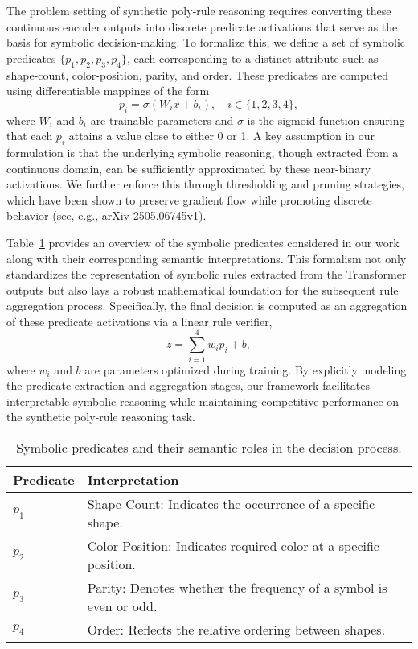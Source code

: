 \documentclass{article}
\begin{document}
The problem setting of synthetic poly‐rule reasoning requires converting these continuous encoder outputs into discrete predicate activations that serve as the basis for symbolic decision-making. To formalize this, we define a set of symbolic predicates \( \{p_1, p_2, p_3, p_4\} \), each corresponding to a distinct attribute such as shape-count, color-position, parity, and order. These predicates are computed using differentiable mappings of the form
\[
p_i = \sigma(W_i x + b_i), \quad i \in \{1,2,3,4\},
\]
where \( W_i \) and \( b_i \) are trainable parameters and \(\sigma\) is the sigmoid function ensuring that each \( p_i \) attains a value close to either 0 or 1. A key assumption in our formulation is that the underlying symbolic reasoning, though extracted from a continuous domain, can be sufficiently approximated by these near-binary activations. We further enforce this through thresholding and pruning strategies, which have been shown to preserve gradient flow while promoting discrete behavior (see, e.g., arXiv 2505.06745v1).

Table~\ref{tab:predicates} provides an overview of the symbolic predicates considered in our work along with their corresponding semantic interpretations. This formalism not only standardizes the representation of symbolic rules extracted from the Transformer outputs but also lays a robust mathematical foundation for the subsequent rule aggregation process. Specifically, the final decision is computed as an aggregation of these predicate activations via a linear rule verifier,
\[
z = \sum_{i=1}^4 w_i p_i + b,
\]
where \(w_i\) and \(b\) are parameters optimized during training. By explicitly modeling the predicate extraction and aggregation stages, our framework facilitates interpretable symbolic reasoning while maintaining competitive performance on the synthetic poly‐rule reasoning task.

\begin{table}[h]
\centering
\begin{tabular}{l l}
\hline
\textbf{Predicate} & \textbf{Interpretation} \\
\hline
\( p_1 \) & Shape-Count: Indicates the occurrence of a specific shape. \\
\( p_2 \) & Color-Position: Indicates required color at a specific position. \\
\( p_3 \) & Parity: Denotes whether the frequency of a symbol is even or odd. \\
\( p_4 \) & Order: Reflects the relative ordering between shapes. \\
\hline
\end{tabular}
\caption{Symbolic predicates and their semantic roles in the decision process.}
\label{tab:predicates}
\end{table}
\end{document}
